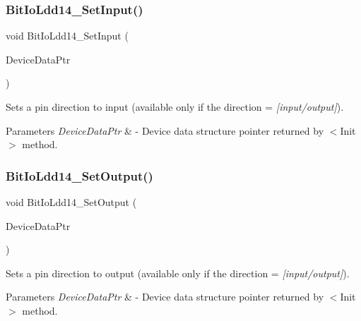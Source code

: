 \subsubsection{\texorpdfstring{Bit\+Io\+Ldd14\+\_\+\+Set\+Input()}{BitIoLdd14\_SetInput()}}
{\footnotesize\ttfamily void Bit\+Io\+Ldd14\+\_\+\+Set\+Input (\begin{DoxyParamCaption}\item[{\hyperlink{group___p_e___types__module_gac5cf1362f1f0e3a2ce71b1bf2276d091}{L\+D\+D\+\_\+\+T\+Device\+Data} $\ast$}]{Device\+Data\+Ptr }\end{DoxyParamCaption})}



Sets a pin direction to input (available only if the direction = {\itshape \mbox{[}input/output\mbox{]}}). 


\begin{DoxyParams}{Parameters}
{\em Device\+Data\+Ptr} & -\/ Device data structure pointer returned by $<$\+Init$>$ method. \\
\hline
\end{DoxyParams}
\mbox{\label{group___bit_io_ldd14__module_ga92faf92eda5aee7a1ee9aae450d3b062}} 
\subsubsection{\texorpdfstring{Bit\+Io\+Ldd14\+\_\+\+Set\+Output()}{BitIoLdd14\_SetOutput()}}
{\footnotesize\ttfamily void Bit\+Io\+Ldd14\+\_\+\+Set\+Output (\begin{DoxyParamCaption}\item[{\hyperlink{group___p_e___types__module_gac5cf1362f1f0e3a2ce71b1bf2276d091}{L\+D\+D\+\_\+\+T\+Device\+Data} $\ast$}]{Device\+Data\+Ptr }\end{DoxyParamCaption})}



Sets a pin direction to output (available only if the direction = {\itshape \mbox{[}input/output\mbox{]}}). 


\begin{DoxyParams}{Parameters}
{\em Device\+Data\+Ptr} & -\/ Device data structure pointer returned by $<$\+Init$>$ method. \\
\hline
\end{DoxyParams}
\mbox{\label{group___bit_io_ldd14__module_gafc0efe9c15e9975b1707af654e976785}} 
